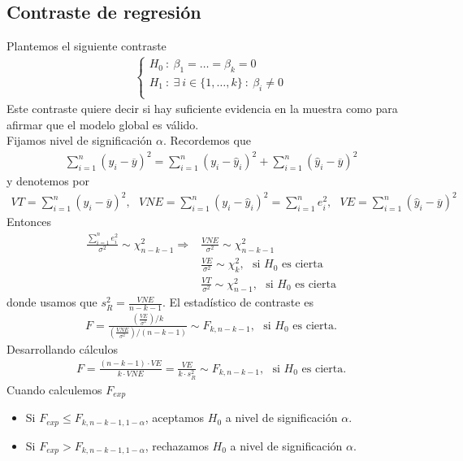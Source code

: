 \subsection{Contraste de regresión}
\noindent Plantemos el siguiente contraste
\begin{align*}
    \left\{ \begin{array}{lcc}
             H_0 \ : \ \beta_1 = \ldots = \beta_k = 0\\
             H_1 \ : \ \exists \ i \in \{1,\ldots,k\} \ : \ \beta_i \not = 0 \\
             \end{array}
   \right.
\end{align*}
Este contraste quiere decir si hay suficiente evidencia en la muestra como para afirmar que el modelo global es válido.
\\
\newline
Fijamos nivel de significación $\alpha$. Recordemos que
\begin{align*}
    \sum_{i=1}^{n} (y_i -\overline{y})^2 = \sum_{i=1}^{n} (y_i - \widehat{y}_i)^2 + \sum_{i=1}^{n} (\widehat{y}_i - \overline{y})^2
\end{align*}
y denotemos por
\begin{align*}
    VT = \sum_{i=1}^{n} (y_i -\overline{y})^2, \ \ \ VNE = \sum_{i=1}^{n} (y_i - \widehat{y}_i)^2 = \sum_{i=1}^{n} e_i^2, \ \ \  VE = \sum_{i=1}^{n} (\widehat{y}_i - \overline{y})^2
\end{align*}
Entonces
\begin{align*}
    \frac{\sum_{i=1}^{n} e_i^2}{\sigma^2} \sim \chi^2_{n-k-1} \Longrightarrow &\frac{VNE}{\sigma^2} \sim \chi^2_{n-k-1} \\
    &\frac{VE}{\sigma^2} \sim \chi^2_k, \ \ \ \text{si $H_0$ es cierta} \\
    &\frac{VT}{\sigma^2} \sim \chi^2_{n-1}, \ \ \ \text{si $H_0$ es cierta}
\end{align*}
donde usamos que $s_R^2 = \frac{VNE}{n-k-1}$. El estadístico de contraste es 
\begin{align*}
    F = \frac{\left(\frac{VE}{\sigma^2}\right)/k}{\left(\frac{VNE}{\sigma^2}\right)/(n-k-1)} \sim F_{k,n-k-1}, \ \ \ \text{si $H_0$ es cierta}.
\end{align*}
Desarrollando cálculos 
\begin{align*}
    F = \frac{(n-k-1) \cdot VE}{k \cdot VNE} = \frac{VE}{k \cdot s_R^2} \sim F_{k,n-k-1}, \ \ \ \text{si $H_0$ es cierta}.
\end{align*}
Cuando calculemos $F_{exp}$
\begin{itemize}
    \item Si $F_{exp} \leq F_{k,n-k-1,1-\alpha}$, aceptamos $H_0$ a nivel de significación $\alpha$.
    \item Si $F_{exp} > F_{k,n-k-1,1-\alpha}$, rechazamos $H_0$ a nivel de significación $\alpha$.
\end{itemize}

